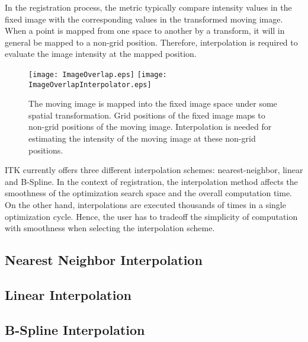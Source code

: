 

In the registration process, the metric typically compare intensity values 
in the fixed image with the corresponding values in the transformed moving
image. When a point is mapped from one space to another by a transform,
it will in general be mapped to a non-grid position. Therefore, interpolation
is required to evaluate the image intensity at the mapped position.

\begin{figure}
\center
\texttt{[image: ImageOverlap.eps]}
\texttt{[image: ImageOverlapInterpolator.eps]}
\caption{ The moving image is mapped into the fixed image space under some spatial
transformation. Grid positions of the fixed image maps to non-grid positions of the
moving image. Interpolation is needed for estimating the intensity of the
moving image at these non-grid positions.}
\label{fig:ImageOverlapInterpolator}
\end{figure}

ITK currently offers three different interpolation schemes: nearest-neighbor,
linear and B-Spline. In the context of registration, the interpolation method
affects the smoothness of the optimization search space and the overall
computation time. On the other hand, interpolations are executed thousands of
times in a single optimization cycle. Hence, the user has to tradeoff the
simplicity of computation with smoothness when selecting the interpolation 
scheme.

 
\subsection{Nearest Neighbor Interpolation}
\label{sec:NearestNeighborInterpolation}

\subsection{Linear Interpolation}
\label{sec:LinearInterpolation}

\subsection{B-Spline Interpolation}
\label{sec:BSplineInterpolation}


